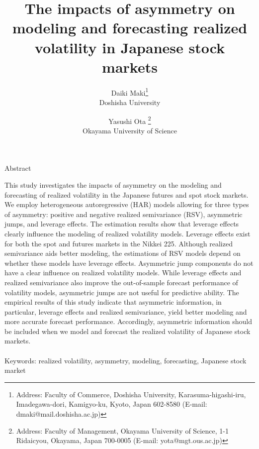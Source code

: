 \documentclass[10pt]{article}
\begin{document}
\title{The impacts of asymmetry on modeling and forecasting realized volatility in Japanese stock markets} 
\author{Daiki Maki\thanks{Address: Faculty of Commerce, Doshisha University, 
         Karasuma-higashi-iru, Imadegawa-dori, Kamigyo-ku, Kyoto, Japan 602-8580 
         (E-mail: dmaki@mail.doshisha.ac.jp)}  \\ 
         Doshisha University
         \and Yasushi Ota \thanks{Address: Faculty of Management, Okayama University of Science, 1-1 Ridaicyou, Okayama, Japan 700-0005
         (E-mail: yota@mgt.ous.ac.jp)} \\ 
         Okayama University of Science}
\date{}
\maketitle

\begin{center}
\large{Abstract}
\end{center}
\fontsize{11pt}{25pt}\selectfont
This study investigates the impacts of asymmetry on the modeling and forecasting of realized volatility in the Japanese futures and spot stock markets. 
We employ heterogeneous autoregressive (HAR) models allowing for three types of asymmetry: 
positive and negative realized semivariance (RSV), asymmetric jumps, and leverage effects. 
The estimation results show that leverage effects clearly influence the modeling of realized volatility models. 
Leverage effects exist for both the spot and futures markets in the Nikkei 225. 
Although realized semivariance aids better modeling,   
the estimations of RSV models depend on whether these models have leverage effects. 
Asymmetric jump components do not have a clear influence on realized volatility models.  
While leverage effects and realized semivariance also improve the out-of-sample forecast performance of volatility models,    
asymmetric jumps are not useful for predictive ability. 
The empirical results of this study indicate that asymmetric information, in particular, leverage effects and realized semivariance, yield better modeling and more accurate forecast performance. 
Accordingly, asymmetric information should be included when we model and forecast the realized volatility of Japanese stock markets. 
\\ \\ 
Keywords: realized volatility, asymmetry, modeling, forecasting, Japanese stock market
\\

\newpage
\fontsize{11pt}{27pt}\selectfont
\end{document}
